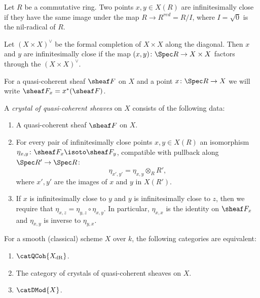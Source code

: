 \documentclass{ck-article}
\newcommand\dR{{\mathrm{dR}}}
\begin{document}
\begin{Def}
    Let $R$ be a commutative ring.
    Two points $x, y \in X(R)$ are infinitesimally close if they have the same image under the map $R \to R^{red} = R/I$, where $I = \sqrt{0}$ is the nil-radical of $R$.
\end{Def}

Let $(X \times X)^\vee$ be the formal completion of $X \times X$ along the diagonal.
Then $x$ and $y$ are infinitesimally close if the map $(x,y) \colon \Spec R \to X \times X$ factors through the $(X \times X)^\vee$.

For a quasi-coherent sheaf $\sheaf F$ on $X$ and a point $x\colon \Spec R \to X$ we will write $\sheaf F_x = x^*(\sheaf F)$.

\begin{Def}
    A \emph{crystal of quasi-coherent sheaves} on $X$ consists of the following data:
    \begin{enumerate}
        \item A quasi-coherent sheaf $\sheaf F$ on $X$.
        \item For every pair of infinitesimally close points $x,y \in X(R)$ an isomorphism $\eta_{x,y}\colon \sheaf F_x \isoto \sheaf F_y$, compatible with pullback along $\Spec R' \to \Spec R$:
            \[
                \eta_{x',y'} = \eta_{x,y} \otimes_R R',
            \]
            where $x',y'$ are the images of $x$ and $y$ in $X(R')$.
        \item If $x$ is infinitesimally close to $y$ and $y$ is infinitesimally close to $z$, then we require that $\eta_{x,z} = \eta_{y,z} \circ \eta_{x,y}$.
            In particular, $\eta_{x,x}$ is the identity on $\sheaf F_x$ and $\eta_{x,y}$ is inverse to $\eta_{y,x}$.
    \end{enumerate}
\end{Def}

\begin{Prop}
    For a smooth (classical) scheme $X$ over $k$, the following categories are equivalent:
    \begin{enumerate}
        \item $\catQCoh{X_{\dR}}$.
        \item The category of crystals of quasi-coherent sheaves on $X$.
        \item $\catDMod{X}$.
    \end{enumerate}
\end{Prop}
\end{document}
